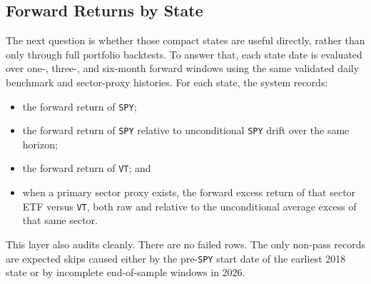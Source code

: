 \documentclass[conference]{IEEEtran}
\begin{document}
\subsection{Forward Returns by State}

The next question is whether those compact states are useful directly, rather than only through full portfolio backtests. To answer that, each state date is evaluated over one-, three-, and six-month forward windows using the same validated daily benchmark and sector-proxy histories. For each state, the system records:
\begin{itemize}[leftmargin=1.4em]
    \item the forward return of \texttt{SPY};
    \item the forward return of \texttt{SPY} relative to unconditional \texttt{SPY} drift over the same horizon;
    \item the forward return of \texttt{VT}; and
    \item when a primary sector proxy exists, the forward excess return of that sector ETF versus \texttt{VT}, both raw and relative to the unconditional average excess of that same sector.
\end{itemize}

This layer also audits cleanly. There are no failed rows. The only non-pass records are expected skips caused either by the pre-\texttt{SPY} start date of the earliest 2018 state or by incomplete end-of-sample windows in 2026.
\end{document}
